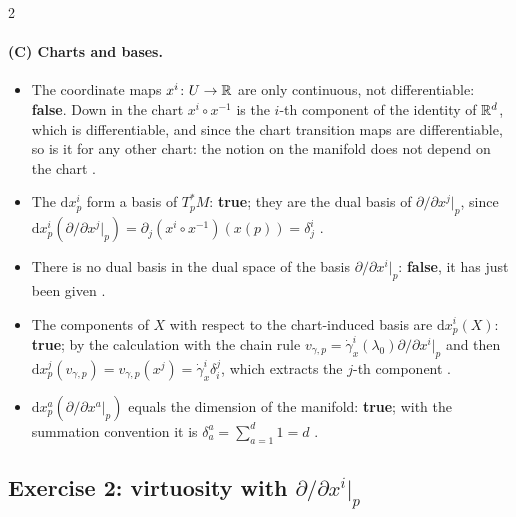 \begin{paracol}{2}
\paragraph{(C) Charts and bases.}
\begin{itemize}
  \item The coordinate maps $x^i\colon U\to\mathbb{R}$ are only continuous, not differentiable: \textbf{false}. Down in the chart $x^i\circ x^{-1}$ is the $i$-th component of the identity of $\mathbb{R}^d$, which is differentiable, and since the chart transition maps are differentiable, so is it for any other chart: the notion on the manifold does not depend on the chart .
  \item The $\mathrm dx^i_p$ form a basis of $T^*_pM$: \textbf{true}; they are the dual basis of $\partial/\partial x^j|_p$, since $\mathrm dx^i_p(\partial/\partial x^j|_p)=\partial_j(x^i\circ x^{-1})(x(p))=\delta^i_j$ .
  \item There is no dual basis in the dual space of the basis $\partial/\partial x^i|_p$: \textbf{false}, it has just been given .
  \item The components of $X$ with respect to the chart-induced basis are $\mathrm dx^i_p(X)$: \textbf{true}; by the calculation with the chain rule $v_{\gamma,p}=\dot\gamma^i_x(\lambda_0)\partial/\partial x^i|_p$ and then $\mathrm dx^j_p(v_{\gamma,p})=v_{\gamma,p}(x^j)=\dot\gamma^i_x\delta^j_i$, which extracts the $j$-th component .
  \item $\mathrm dx^a_p(\partial/\partial x^a|_p)$ equals the dimension of the manifold: \textbf{true}; with the summation convention it is $\delta^a_a=\sum_{a=1}^d1=d$ .
\end{itemize}

\subsection*{Exercise 2: virtuosity with $\partial/\partial x^i|_p$}


\end{paracol}
